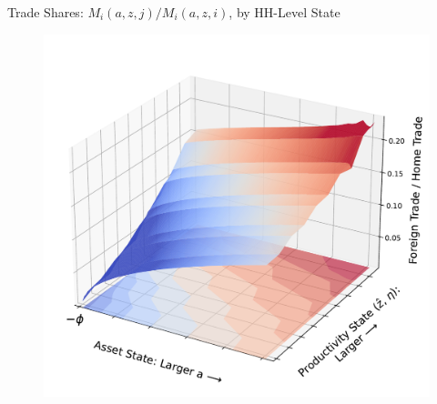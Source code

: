 \documentclass[9pt,pdftex,aspectratio=1610]{beamer}
\theoremstyle{definition}
\begin{document}
\begin{frame}[t]{Trade Shares: $M_{i}(a,z,j) / M_{i}(a,z,i)$, by HH-Level State}
\vspace{-.5cm}
\begin{figure}[t]
\centerline{
\includegraphics[scale = 0.5]{../notes/figures/trade-share.pdf}}
\end{figure}
\end{frame}
\end{document}
